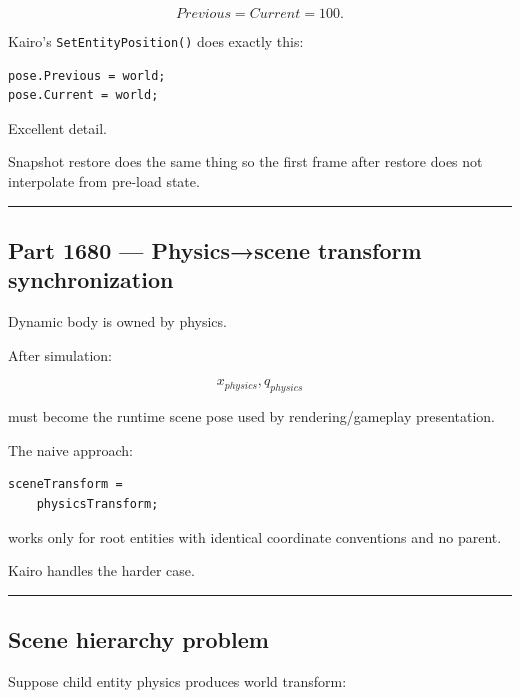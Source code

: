\[
Previous=Current=100.
\]

Kairo's \texttt{SetEntityPosition()} does exactly this:

\begin{verbatim}
pose.Previous = world;
pose.Current = world;
\end{verbatim}

Excellent detail.

Snapshot restore does the same thing so the first frame after restore does not interpolate from pre-load state.

\begin{center}\rule{0.5\linewidth}{0.5pt}\end{center}

\subsection{Part 1680 --- Physics→scene transform synchronization}\label{06-engine-ii-ch037-part-1680-physicsscene-transform-synchronization}

\hypertarget{06-engine-ii-ch037-part-1680-physicsscene-transform-synchronization}{}

Dynamic body is owned by physics.

After simulation:

\[
x_{physics},q_{physics}
\]

must become the runtime scene pose used by rendering/gameplay presentation.

The naive approach:

\begin{verbatim}
sceneTransform =
    physicsTransform;
\end{verbatim}

works only for root entities with identical coordinate conventions and no parent.

Kairo handles the harder case.

\begin{center}\rule{0.5\linewidth}{0.5pt}\end{center}

\subsection{Scene hierarchy problem}\label{06-engine-ii-ch037-scene-hierarchy-problem}

\hypertarget{06-engine-ii-ch037-scene-hierarchy-problem}{}

Suppose child entity physics produces world transform:

